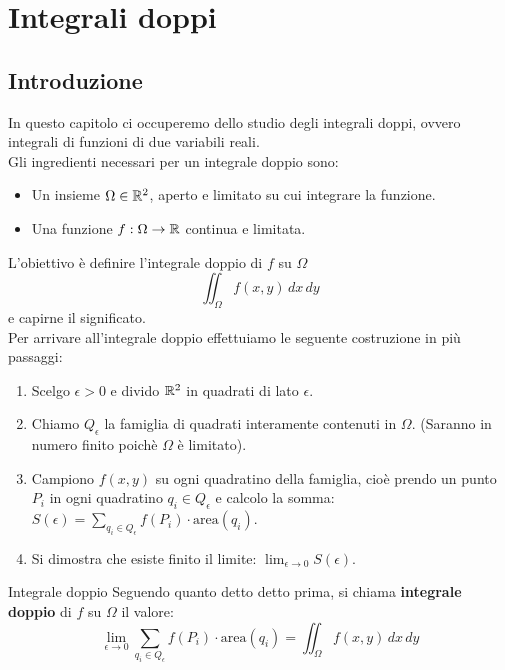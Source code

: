 \chapter{Integrali doppi}

\section{Introduzione}
In questo capitolo ci occuperemo dello studio degli integrali doppi, ovvero integrali di funzioni di due variabili reali.\\

Gli ingredienti necessari per un integrale doppio sono:
\begin{itemize}
\item Un insieme $\Omega \in \mathbb{R}^2$, aperto e limitato su cui integrare la funzione.
\item Una funzione $f:\Omega \rightarrow \mathbb{R}$ continua e limitata.
\end{itemize}

L'obiettivo è definire l'integrale doppio di $f$ su $\Omega$
\[
\iint_{\Omega} f(x,y) \, dx \, dy
\]
e capirne il significato.\\

Per arrivare all'integrale doppio effettuiamo le seguente costruzione in più passaggi:
\begin{enumerate}
  \item Scelgo $\epsilon>0$ e divido $\mathbb{R}^2$ in quadrati di lato $\epsilon$.
  \item Chiamo $Q_{\epsilon}$ la famiglia di quadrati interamente contenuti in $\Omega$. (Saranno in numero finito poichè $\Omega$ è limitato).
  \item Campiono $f(x,y)$ su ogni quadratino della famiglia, cioè prendo un punto $P_i$ in ogni quadratino $q_i\in Q_{\epsilon}$ e calcolo la somma: $S(\epsilon)= \sum_{q_i \in Q_{\epsilon}} f(P_i) \cdot \text{area}(q_i)$.
  \item Si dimostra che esiste finito il limite: $\lim_{\epsilon \to 0} S(\epsilon)$.
\end{enumerate}

\begin{definizione}{Integrale doppio}
  Seguendo quanto detto detto prima, si chiama \textbf{integrale doppio} di $f$ su $\Omega$ il valore:
  \[
  \lim_{\epsilon \to 0} \sum_{q_i \in Q_{\epsilon}} f(P_i) \cdot \text{area}(q_i) = \iint_{\Omega} f(x,y) \, dx \, dy
  \]
\end{definizione}

